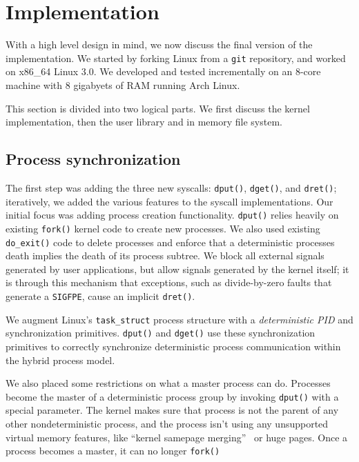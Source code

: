 
\section{Implementation}

With a high level design in mind, we now discuss the final version of the
implementation. We started by forking Linux from a {\tt git} repository, and
worked on x86\_64 Linux 3.0. We developed and tested incrementally on an 8-core
machine with 8 gigabyets of RAM running Arch Linux.

This section is divided into two logical parts. We first discuss the kernel
implementation, then the user library and in memory file system.

\subsection{Process synchronization}

The first step was adding the three new syscalls: {\tt dput()}, {\tt dget()},
and {\tt dret()}; iteratively, we added the various features to the syscall
implementations. Our initial focus was adding process creation functionality.
{\tt dput()} relies heavily on existing {\tt fork()} kernel code to create new
processes. We also used existing {\tt do\_exit()} code to delete processes
and enforce that a deterministic processes death implies the death of its
process subtree. We block all external signals generated by user applications,
but allow signals generated by the kernel itself; it is through this mechanism
that exceptions, such as divide-by-zero faults that generate a {\tt SIGFPE},
cause an implicit {\tt dret()}.

We augment Linux's {\tt task\_struct} process structure with a
\emph{deterministic PID} and synchronization primitives. {\tt dput()} and
{\tt dget()} use these synchronization primitives to correctly synchronize
deterministic process communication within the hybrid process model.

We also placed some restrictions on what a master process can do. Processes
become the master of a deterministic process group by invoking {\tt dput()} with
a special parameter. The kernel makes sure that process is not the parent of
any other nondeterministic process, and the process isn't using any
unsupported virtual memory features, like ``kernel samepage
merging''~\cite{arcangeli2009increasing} or huge pages. Once a process
becomes a master, it can no longer {\tt fork()} 

